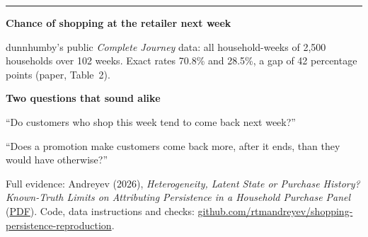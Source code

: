 \documentclass[11pt]{article}
\newcommand{\thinrule}{{\color{rulec}\rule{\textwidth}{0.4pt}}\par}
\begin{document}
{\vspace{11pt}
\thinrule
\vspace{9pt}

\noindent
\begin{minipage}[t]{0.52\textwidth}
\vspace{0pt}\raggedright
{\bfseries Chance of shopping at the retailer next week}\par
\vspace{7pt}
\par
\vspace{4pt}
{\footnotesize\color{muted}dunnhumby's public \emph{Complete Journey} data: all household-weeks of 2,500 households
over 102 weeks. Exact rates 70.8\% and 28.5\%, a gap of 42 percentage points (paper, Table~2).\par}
\end{minipage}\hfill
\begin{minipage}[t]{0.42\textwidth}
\vspace{0pt}\raggedright
{\bfseries Two questions that sound alike}\par
\vspace{7pt}
``Do customers who shop this week tend to come back next week?''\par
\vspace{1pt}{\bfseries The records answer this clearly. Yes.}\par
\vspace{9pt}
``Does a promotion make customers come back more, after it ends, than they would have
otherwise?''\par
\vspace{1pt}{\bfseries The records cannot answer this. A test with a holdout
group can.}\par
\end{minipage}

\vfill
{\footnotesize\color{muted}
Full evidence: Andreyev (2026), \emph{Heterogeneity, Latent State or Purchase History? Known-Truth
Limits on Attributing Persistence in a Household Purchase Panel}
(\href{https://github.com/rtmandreyev/shopping-persistence-reproduction/blob/main/paper/main.pdf}{PDF}).
Code, data instructions and checks:
\href{https://github.com/rtmandreyev/shopping-persistence-reproduction}{github.com/rtmandreyev/shopping-persistence-reproduction}.\par}
}
\end{document}
